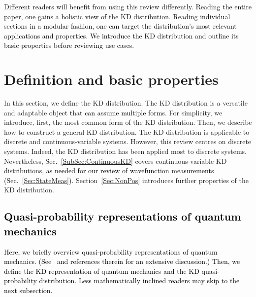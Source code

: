 \documentclass[%
 reprint,
superscriptaddress,
nofootinbib,
bibnotes,
 amsmath,amssymb,
 aps,
]{revtex4-1}
\theoremstyle{plain}
\newcommand{\Dave}[1]{\textcolor{black}{#1} }
\newcommand{\nicole}[1]{\textcolor{black}{#1} }
\begin{document}
\nicole{Different readers will benefit from using this review differently. Reading the entire paper, one gains a holistic view of the KD distribution. Reading individual sections in a modular fashion, one can target the distribution's most relevant applications and properties.
}
\nicole{We introduce the KD distribution and outline its basic properties before reviewing \Dave{use cases.}}



\section{Definition and basic properties}
\label{Sec:DefProp}

In this section, we 
define the KD distribution. The KD distribution is a versatile and adaptable 
\nicole{object that can assume multiple forms.}
For simplicity, we introduce,  first,  the most common form of the KD distribution. Then, we describe how to construct a general KD distribution. The KD distribution is applicable to discrete and continuous-variable systems. However, this review centres on discrete systems.   Indeed, the KD distribution has been applied most to discrete systems.  Nevertheless, 
\nicole{Sec.~\ref{SubSec:ContinuousKD} }
covers continuous-variable KD distributions, \Dave{as needed for our review of wavefunction measurements 
\nicole{(Sec.~\ref{Sec:StateMeas}).}} Section~\ref{Sec:NonPos} introduces further 
properties of the KD distribution.





\subsection{\Dave{Quasi-probability representations of quantum mechanics}}


\nicole{Here, we briefly overview
quasi-probability representations of quantum mechanics. 
(See~\cite{Ferrie2011} and references therein for an extensive discussion.)
Then, we define the KD representation of quantum mechanics and the KD quasi-probability distribution.  
Less mathematically inclined readers may skip to the next subsection.  
}  
\end{document}

